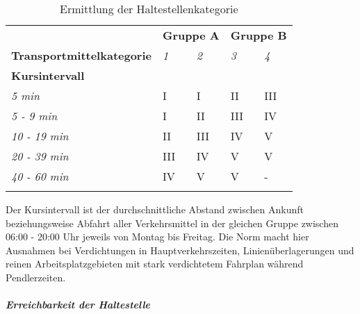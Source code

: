 \begin{longtable}[c]{l | p{2.3cm} p{2.3cm} | p{2.3cm} p{2.3cm}}
        \midrule
        \textbf{}
                                & \multicolumn{2}{l|}{\textbf{Gruppe A}}
                                & \multicolumn{2}{l}{\textbf{Gruppe B}}\\
        \textbf{Transportmittelkategorie}
                                & \textit{1}
                                & \textit{2}
                                & \textit{3}
                                & \textit{4}\\
        \textbf{Kursintervall}
                                &
                                &
                                &
                                &\\
        \textit{5 min}
                                & I
                                & I
                                & II
                                & III\\
        \textit{5 - 9 min}
                                & I
                                & II
                                & III
                                & IV\\
        \textit{10 - 19 min}
                                & II
                                & III
                                & IV
                                & V\\
        \textit{20 - 39 min}
                                & III
                                & IV
                                & V
                                & V\\
        \textit{40 - 60 min}
                                & IV
                                & V
                                & V
                                & -\\
        \bottomrule
    \caption{Ermittlung der Haltestellenkategorie}
    \label{table:Ermittlung der Haltestellenkategorie}
\end{longtable}

Der Kursintervall ist der durchschnittliche Abstand zwischen Ankunft beziehungsweise Abfahrt aller Verkehrsmittel in der gleichen Gruppe zwischen 06:00 - 20:00 Uhr jeweils von Montag bis Freitag.
Die Norm macht hier Ausnahmen bei Verdichtungen in Hauptverkehrszeiten, Linienüberlagerungen und reinen Arbeitsplatzgebieten mit stark verdichtetem Fahrplan während Pendlerzeiten.

\subparagraph{Erreichbarkeit der Haltestelle}~\\
\label{Definition ÖV-Güteklassen:Erreichbarkeit der Haltestelle}


